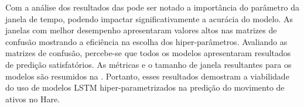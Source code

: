 

Com a análise dos resultados das  pode ser notado a importância do parâmetro da janela de tempo, podendo impactar significativamente a acurácia do modelo. As janelas com melhor desempenho apresentaram valores altos nas matrizes de confusão mostrando a eficiência na escolha dos hiper-parâmetros. Avaliando as matrizes de confusão, percebe-se que todos os modelos apresentaram resultados de predição satisfatórios. As métricas e o tamanho de janela resultantes para os modelos são resumidos na . Portanto, esses resultados demostram a viabilidade do uso de modelos \acrshort{LSTM} hiper-parametrizados na predição do movimento de ativos no Hare.



